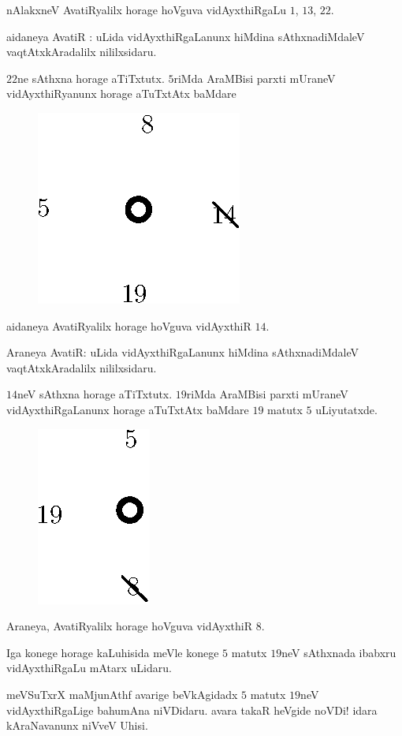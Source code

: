 nAlakxneV AvatiRyalilx horage hoVguva vidAyxthiRgaLu $1$, $13$, $22$.

aidaneya AvatiR : uLida vidAyxthiRgaLanunx hiMdina sAthxnadiMdaleV vaqtAtxkAradalilx nililxsidaru.

$22$ne sAthxna horage aTiTxtutx. $5$riMda AraMBisi parxti mUraneV vidAyxthiRyanunx horage aTuTxtAtx baMdare
\begin{figure}[H]
\centering
\includegraphics{src/figures/fig13.eps}
\end{figure}

aidaneya AvatiRyalilx horage hoVguva vidAyxthiR $14$.

Araneya AvatiR: uLida vidAyxthiRgaLanunx hiMdina sAthxnadiMdaleV vaqtAtxkAradalilx nililxsidaru.

$14$neV sAthxna horage aTiTxtutx. $19$riMda AraMBisi parxti mUraneV vidAyxthiRgaLanunx horage aTuTxtAtx baMdare $19$ matutx $5$ uLiyutatxde. 
\begin{figure}[H]
\centering
\includegraphics{src/figures/fig14.eps}
\end{figure}

Araneya, AvatiRyalilx horage hoVguva vidAyxthiR $8$.

Iga konege horage kaLuhisida meVle konege $5$ matutx $19$neV sAthxnada ibabxru vidAyxthiRgaLu mAtarx uLidaru.

meVSuTxrX maMjunAthf avarige beVkAgidadx $5$ matutx $19$neV vidAyxthiRgaLige bahumAna niVDidaru. avara takaR heVgide noVDi! idara kAraNavanunx niVveV Uhisi.
